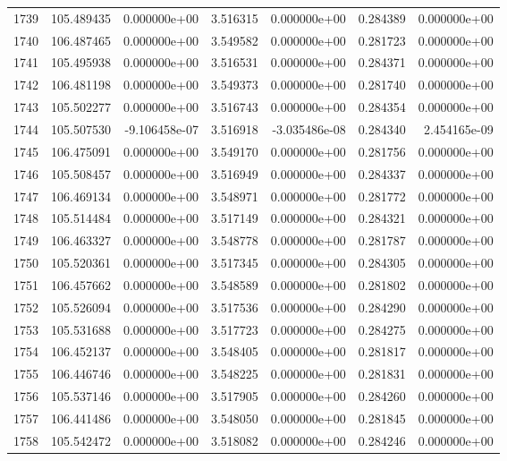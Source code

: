\begin{tabular}{rrrrrrr}
1739 & 105.489435 &  0.000000e+00 &  3.516315 &  0.000000e+00 &    0.284389 &  0.000000e+00 \\
1740 & 106.487465 &  0.000000e+00 &  3.549582 &  0.000000e+00 &    0.281723 &  0.000000e+00 \\
1741 & 105.495938 &  0.000000e+00 &  3.516531 &  0.000000e+00 &    0.284371 &  0.000000e+00 \\
1742 & 106.481198 &  0.000000e+00 &  3.549373 &  0.000000e+00 &    0.281740 &  0.000000e+00 \\
1743 & 105.502277 &  0.000000e+00 &  3.516743 &  0.000000e+00 &    0.284354 &  0.000000e+00 \\
1744 & 105.507530 & -9.106458e-07 &  3.516918 & -3.035486e-08 &    0.284340 &  2.454165e-09 \\
1745 & 106.475091 &  0.000000e+00 &  3.549170 &  0.000000e+00 &    0.281756 &  0.000000e+00 \\
1746 & 105.508457 &  0.000000e+00 &  3.516949 &  0.000000e+00 &    0.284337 &  0.000000e+00 \\
1747 & 106.469134 &  0.000000e+00 &  3.548971 &  0.000000e+00 &    0.281772 &  0.000000e+00 \\
1748 & 105.514484 &  0.000000e+00 &  3.517149 &  0.000000e+00 &    0.284321 &  0.000000e+00 \\
1749 & 106.463327 &  0.000000e+00 &  3.548778 &  0.000000e+00 &    0.281787 &  0.000000e+00 \\
1750 & 105.520361 &  0.000000e+00 &  3.517345 &  0.000000e+00 &    0.284305 &  0.000000e+00 \\
1751 & 106.457662 &  0.000000e+00 &  3.548589 &  0.000000e+00 &    0.281802 &  0.000000e+00 \\
1752 & 105.526094 &  0.000000e+00 &  3.517536 &  0.000000e+00 &    0.284290 &  0.000000e+00 \\
1753 & 105.531688 &  0.000000e+00 &  3.517723 &  0.000000e+00 &    0.284275 &  0.000000e+00 \\
1754 & 106.452137 &  0.000000e+00 &  3.548405 &  0.000000e+00 &    0.281817 &  0.000000e+00 \\
1755 & 106.446746 &  0.000000e+00 &  3.548225 &  0.000000e+00 &    0.281831 &  0.000000e+00 \\
1756 & 105.537146 &  0.000000e+00 &  3.517905 &  0.000000e+00 &    0.284260 &  0.000000e+00 \\
1757 & 106.441486 &  0.000000e+00 &  3.548050 &  0.000000e+00 &    0.281845 &  0.000000e+00 \\
1758 & 105.542472 &  0.000000e+00 &  3.518082 &  0.000000e+00 &    0.284246 &  0.000000e+00 \\

\end{tabular}
